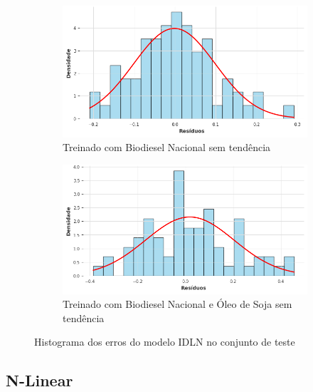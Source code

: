 \begin{figure}[htbp]
	\begin{subfigure}[b]{0.40\textwidth}
		\centering
		\includegraphics[width=\textwidth]{figuras/idln_brasil_detrend_residuals_histogram.png} %
		\caption{Treinado com Biodiesel Nacional sem tendência}
		\label{fig:idln_brasil_detrend_residuals_histogram}
	\end{subfigure}
	\hfill
	\begin{subfigure}[b]{0.40\textwidth}
		\centering
		\includegraphics[width=\textwidth]{figuras/idln_brasil_oil_detrend_residuals_histogram.png} %
		\caption{Treinado com Biodiesel Nacional e Óleo de Soja sem tendência}
		\label{fig:idln_brasil_oil_detrend_residuals_histogram}
	\end{subfigure}

	\caption{Histograma dos erros do modelo \acs{IDLN} no conjunto de teste}
	\label{fig:idln_residuals_histogram}
\end{figure}

\subsection{\acs{N-Linear}}
